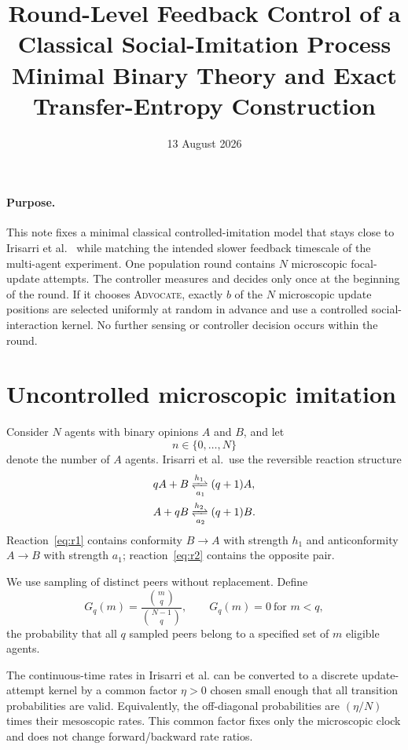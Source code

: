 \documentclass[11pt]{article}
\title{Round-Level Feedback Control of a Classical Social-Imitation Process\\
\large Minimal Binary Theory and Exact Transfer-Entropy Construction}
\author{}
\date{13 August 2026}
\newcommand{\Adv}{\textsc{Advocate}}
\begin{document}
\maketitle

\paragraph{Purpose.}
This note fixes a minimal classical controlled-imitation model that stays close to
Irisarri et al.~\cite{irisarri2026} while matching the intended slower feedback
timescale of the multi-agent experiment. One population round contains $N$
microscopic focal-update attempts. The controller measures and decides only once
at the beginning of the round. If it chooses \Adv, exactly $b$ of the $N$
microscopic update positions are selected uniformly at random in advance and use
a controlled social-interaction kernel. No further sensing or controller decision
occurs within the round.

\section{Uncontrolled microscopic imitation}

Consider $N$ agents with binary opinions $A$ and $B$, and let
\[
n\in\{0,\ldots,N\}
\]
denote the number of $A$ agents. Irisarri et al.~use the reversible reaction
structure
\begin{align}
qA+B &\xrightleftharpoons[a_1]{h_1} (q+1)A, \label{eq:r1}\\
A+qB &\xrightleftharpoons[a_2]{h_2} (q+1)B. \label{eq:r2}
\end{align}
Reaction~\eqref{eq:r1} contains conformity $B\to A$ with strength $h_1$ and
anticonformity $A\to B$ with strength $a_1$; reaction~\eqref{eq:r2} contains the
opposite pair.

We use sampling of distinct peers without replacement. Define
\[
G_q(m)=\frac{\binom{m}{q}}{\binom{N-1}{q}},
\qquad
G_q(m)=0\ \text{for }m<q,
\]
the probability that all $q$ sampled peers belong to a specified set of $m$
eligible agents.

The continuous-time rates in Irisarri et al. can be converted to a discrete
update-attempt kernel by a common factor $\eta>0$ chosen small enough that all
transition probabilities are valid. Equivalently, the off-diagonal probabilities
are $(\eta/N)$ times their mesoscopic rates. This common factor fixes only the
microscopic clock and does not change forward/backward rate ratios.
\end{document}
